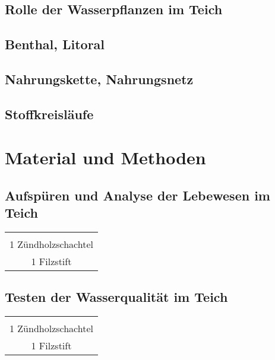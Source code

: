\documentclass{article}
\begin{document}
    \subsection{Rolle der Wasserpflanzen im Teich}
    
    \subsection{Benthal, Litoral}
    
    \subsection{Nahrungskette, Nahrungsnetz}
    
    \subsection{Stoffkreisläufe}


\section{Material und Methoden}
    
    \subsection{Aufspüren und Analyse der Lebewesen im Teich}
    
    
        \begin{table}[h!]
        \centering
        \begin{tabular}{|c|} 
         \hline
         \\
         1 Zündholzschachtel \\
         1 Filzstift \\[1ex]
         \hline
        \end{tabular}
        \label{Tiere}
        \end{table}
        
    \subsection{Testen der Wasserqualität im Teich}
    
        \begin{table}[h!]
        \centering
        \begin{tabular}{|c|} 
         \hline
         \\
         1 Zündholzschachtel \\
         1 Filzstift \\[1ex]
         \hline
        \end{tabular}
        \label{Praktikum1}
        \end{table}
\end{document}
